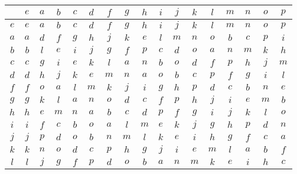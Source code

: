 \documentclass[12pt]{amsart}
\begin{document}
\begin{center}\begin{tabular}{c|cccccccccccccccc}
	&\(e\) &\(a\) &\(b\) &\(c\) &\(d\) &\(f\) &\(g\) &\(h\) &\(i\) &\(j\) &\(k\) &\(l\) &\(m\) &\(n\) &\(o\) &\(p\) \\\hline
	\(e\)  & \(e\)  & \(a\)  & \(b\)  & \(c\)  & \(d\)  & \(f\)  & \(g\)  & \(h\)  & \(i\)  & \(j\)  & \(k\)  & \(l\)  & \(m\)  & \(n\)  & \(o\)  & \(p\)  \\
	\(a\)  & \(a\)  & \(d\)  & \(f\)  & \(g\)  & \(h\)  & \(j\)  & \(k\)  & \(e\)  & \(l\)  & \(m\)  & \(n\)  & \(o\)  & \(b\)  & \(c\)  & \(p\)  & \(i\)  \\
	\(b\)  & \(b\)  & \(l\)  & \(e\)  & \(i\)  & \(j\)  & \(g\)  & \(f\)  & \(p\)  & \(c\)  & \(d\)  & \(o\)  & \(a\)  & \(n\)  & \(m\)  & \(k\)  & \(h\)  \\
	\(c\)  & \(c\)  & \(g\)  & \(i\)  & \(e\)  & \(k\)  & \(l\)  & \(a\)  & \(n\)  & \(b\)  & \(o\)  & \(d\)  & \(f\)  & \(p\)  & \(h\)  & \(j\)  & \(m\)  \\
	\(d\)  & \(d\)  & \(h\)  & \(j\)  & \(k\)  & \(e\)  & \(m\)  & \(n\)  & \(a\)  & \(o\)  & \(b\)  & \(c\)  & \(p\)  & \(f\)  & \(g\)  & \(i\)  & \(l\)  \\
	\(f\)  & \(f\)  & \(o\)  & \(a\)  & \(l\)  & \(m\)  & \(k\)  & \(j\)  & \(i\)  & \(g\)  & \(h\)  & \(p\)  & \(d\)  & \(c\)  & \(b\)  & \(n\)  & \(e\)  \\
	\(g\)  & \(g\)  & \(k\)  & \(l\)  & \(a\)  & \(n\)  & \(o\)  & \(d\)  & \(c\)  & \(f\)  & \(p\)  & \(h\)  & \(j\)  & \(i\)  & \(e\)  & \(m\)  & \(b\)  \\
	\(h\)  & \(h\)  & \(e\)  & \(m\)  & \(n\)  & \(a\)  & \(b\)  & \(c\)  & \(d\)  & \(p\)  & \(f\)  & \(g\)  & \(i\)  & \(j\)  & \(k\)  & \(l\)  & \(o\)  \\
	\(i\)  & \(i\)  & \(f\)  & \(c\)  & \(b\)  & \(o\)  & \(a\)  & \(l\)  & \(m\)  & \(e\)  & \(k\)  & \(j\)  & \(g\)  & \(h\)  & \(p\)  & \(d\)  & \(n\)  \\
	\(j\)  & \(j\)  & \(p\)  & \(d\)  & \(o\)  & \(b\)  & \(n\)  & \(m\)  & \(l\)  & \(k\)  & \(e\)  & \(i\)  & \(h\)  & \(g\)  & \(f\)  & \(c\)  & \(a\)  \\
	\(k\)  & \(k\)  & \(n\)  & \(o\)  & \(d\)  & \(c\)  & \(p\)  & \(h\)  & \(g\)  & \(j\)  & \(i\)  & \(e\)  & \(m\)  & \(l\)  & \(a\)  & \(b\)  & \(f\)  \\
	\(l\)  & \(l\)  & \(j\)  & \(g\)  & \(f\)  & \(p\)  & \(d\)  & \(o\)  & \(b\)  & \(a\)  & \(n\)  & \(m\)  & \(k\)  & \(e\)  & \(i\)  & \(h\)  & \(c\)  \\

\end{tabular}
\end{center}
\end{document}
